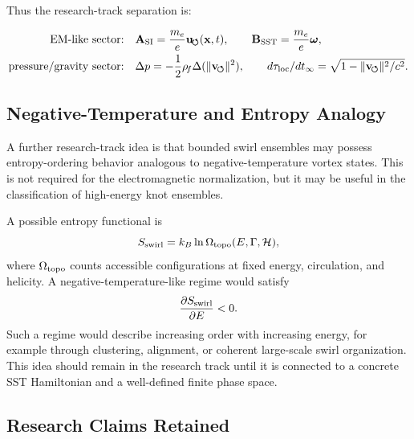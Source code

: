     Thus the research-track separation is:
    
    \begin{align}
        \text{EM-like sector:}
        \quad
        &\mathbf{A}_{\rm SI}
        =
        \frac{m_e}{e}\mathbf{u}_{\!\boldsymbol{\circlearrowleft}}(\mathbf{x},t),
        \qquad
        \mathbf{B}_{\rm SST}
        =
        \frac{m_e}{e}\boldsymbol{\omega},
        \label{eq:em_sector_summary}
        \\
        \text{pressure/gravity sector:}
        \quad
        &\Delta p
        =
        -
        \frac{1}{2}\rho_{\!f}
        \Delta(\lVert\mathbf{v}_{\!\boldsymbol{\circlearrowleft}}\rVert^2),
        \qquad
        d\tau_{\rm loc}/dt_\infty
        =
        \sqrt{1-\lVert\mathbf{v}_{\!\boldsymbol{\circlearrowleft}}\rVert^2/c^2}.
        \label{eq:pressure_gravity_sector_summary}
    \end{align}

\subsection{Negative-Temperature and Entropy Analogy}
    
    A further research-track idea is that bounded swirl ensembles may possess
    entropy-ordering behavior analogous to negative-temperature vortex states.
    This is not required for the electromagnetic normalization, but it may be
    useful in the classification of high-energy knot ensembles.
    
    A possible entropy functional is
    \begin{equation}
        S_{\rm swirl}
        =
        k_B\ln\Omega_{\rm topo}(E,\Gamma,\mathcal{H}),
        \label{eq:swirl_entropy}
    \end{equation}
    where \(\Omega_{\rm topo}\) counts accessible configurations at fixed
    energy, circulation, and helicity.  A negative-temperature-like regime
    would satisfy
    \begin{equation}
        \frac{\partial S_{\rm swirl}}{\partial E}
        <
        0.
        \label{eq:negative_temperature_condition}
    \end{equation}
    Such a regime would describe increasing order with increasing energy,
    for example through clustering, alignment, or coherent large-scale swirl
    organization.  This idea should remain in the research track until it is
    connected to a concrete SST Hamiltonian and a well-defined finite phase
    space.

\subsection{Research Claims Retained}
    
